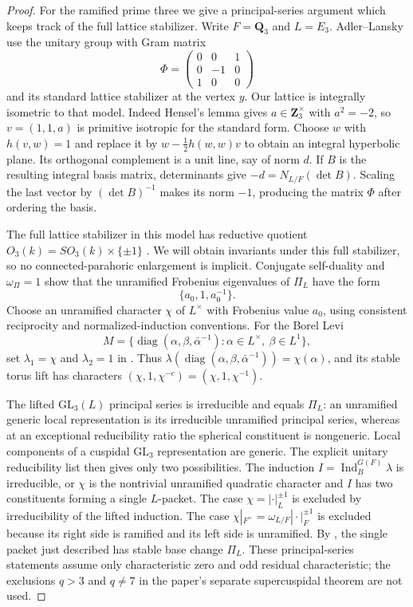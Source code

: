 \begin{proof}
For the ramified prime three we give a principal-series argument which
keeps track of the full lattice stabilizer. Write $F=\mathbf Q_3$ and
$L=E_3$. Adler--Lansky \cite[\S4.1, pp.~10--11]{K17AdlerLansky2010}
use the unitary group with Gram matrix
\[
 \Phi=\begin{pmatrix}0&0&1\\0&-1&0\\1&0&0\end{pmatrix}
\]
and its standard lattice stabilizer at the vertex $y$. Our lattice is
integrally isometric to that model. Indeed Hensel's lemma gives
$a\in\mathbf Z_3^\times$ with $a^2=-2$, so $v=(1,1,a)$ is primitive
isotropic for the standard form. Choose $w$ with $h(v,w)=1$ and replace it
by $w-\tfrac12h(w,w)v$ to obtain an integral hyperbolic plane. Its
orthogonal complement is a unit line, say of norm $d$. If $B$ is the
resulting integral basis matrix, determinants give
$-d=N_{L/F}(\det B)$. Scaling the last vector by $(\det B)^{-1}$ makes
its norm $-1$, producing the matrix $\Phi$ after ordering the basis.

The full lattice stabilizer in this model has reductive quotient
$O_3(k)=SO_3(k)\times\{\pm1\}$
\cite[\S4.2.1, pp.~11--12]{K17AdlerLansky2010}. We will obtain invariants
under this full stabilizer, so no connected-parahoric enlargement is
implicit. Conjugate self-duality and $\omega_\Pi=1$ show that the
unramified Frobenius eigenvalues of $\Pi_L$ have the form
\[
 \{a_0,1,a_0^{-1}\}.
\]
Choose an unramified character $\chi$ of $L^\times$ with Frobenius value
$a_0$, using consistent reciprocity and normalized-induction conventions.
For the Borel Levi
\[
 M=\{\operatorname{diag}(\alpha,\beta,\bar\alpha^{-1}):
       \alpha\in L^\times,\ \beta\in L^1\},
\]
set $\lambda_1=\chi$ and $\lambda_2=1$ in
\cite[(4.4.1), p.~14]{K17AdlerLansky2010}. Thus
$\lambda(\operatorname{diag}(\alpha,\beta,\bar\alpha^{-1}))=
\chi(\alpha)$, and its stable torus lift has characters
$(\chi,1,\chi^{-c})=(\chi,1,\chi^{-1})$.

The lifted $\mathrm{GL}_3(L)$ principal series is irreducible and equals
$\Pi_L$: an unramified generic local representation is its irreducible
unramified principal series, whereas at an exceptional reducibility ratio
the spherical constituent is nongeneric. Local components of a cuspidal
$\mathrm{GL}_3$ representation are generic.
The explicit unitary reducibility list
\cite[\S4.4, pp.~14--15]{K17AdlerLansky2010}
then gives only two possibilities. The induction
$I=\operatorname{Ind}_B^{G(F)}\lambda$ is irreducible, or $\chi$ is the
nontrivial unramified quadratic character and $I$ has two constituents
forming a single $L$-packet. The case $\chi=|\cdot|_L^{\pm1}$ is
excluded by irreducibility of the lifted induction. The case
$\chi|_{F^\times}=\omega_{L/F}|\cdot|_F^{\pm1}$ is excluded because
its right side is ramified and its left side is unramified.
By \cite[Proposition~6.1(1),(4), p.~21, and
Proposition~7.1(i),(iv), p.~28]{K17AdlerLansky2010}, the single packet
just described has stable base change $\Pi_L$.
These principal-series statements assume only characteristic zero and odd
residual characteristic; the exclusions $q>3$ and $q\ne7$ in the paper's
separate supercuspidal theorem are not used.


\end{proof}
